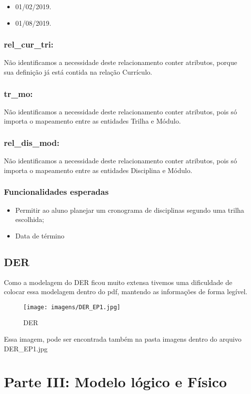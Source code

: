 \documentclass{report}
\begin{document}
\begin{itemize}
	\item 01/02/2019.
	\item 01/08/2019.
\end{itemize}
\subsection{rel\_cur\_tri:}
 Não identificamos a necessidade deste relacionamento conter atributos, porque
 sua definição já está contida na relação Currículo.
\subsection{tr\_mo:}
 Não identificamos a necessidade deste relacionamento conter atributos, pois só
 importa o mapeamento entre as entidades Trilha e Módulo.
\subsection{rel\_dis\_mod:}
 Não identificamos a necessidade deste relacionamento conter atributos, pois só
 importa o mapeamento entre as entidades Disciplina e Módulo.
\subsection{Funcionalidades esperadas}
\begin{itemize}
  \item Permitir ao aluno planejar um cronograma de disciplinas segundo uma trilha
escolhida;
  \item Data de término
\end{itemize}




\section {DER}
Como a modelagem do DER ficou muito extensa tivemos uma dificuldade de colocar essa modelagem dentro do pdf, mantendo as informações de forma legível.

\begin{figure}[!htb]
     \centering
     \texttt{[image: imagens/DER\_EP1.jpg]}
     \caption{DER}
\end{figure}

Essa imagem, pode ser encontrada também na pasta imagens dentro do arquivo DER\_EP1.jpg


\chapter{Parte III: Modelo lógico e Físico}
\end{document}
